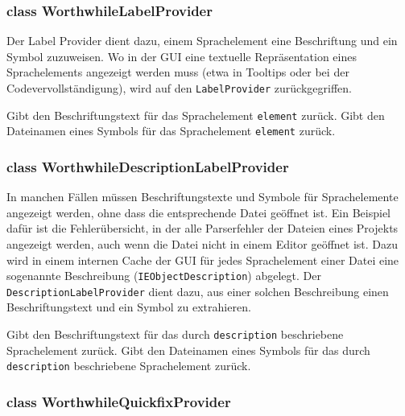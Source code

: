 \subsubsection{class WorthwhileLabelProvider}

Der Label Provider dient dazu, einem Sprachelement eine Beschriftung und ein Symbol zuzuweisen. Wo in der GUI eine textuelle Repräsentation eines Sprachelements angezeigt werden muss (etwa in Tooltips oder bei der Codevervollständigung), wird auf den \texttt{LabelProvider} zurückgegriffen.

\begin{description}
	 Gibt den Beschriftungstext für das Sprachelement \texttt{element} zurück.
	 Gibt den Dateinamen eines Symbols für das Sprachelement \texttt{element} zurück.
\end{description}

\subsubsection{class WorthwhileDescriptionLabelProvider}

In manchen Fällen müssen Beschriftungstexte und Symbole für Sprachelemente angezeigt werden, ohne dass die entsprechende Datei geöffnet ist. Ein Beispiel dafür ist die Fehlerübersicht, in der alle Parserfehler der Dateien eines Projekts angezeigt werden, auch wenn die Datei nicht in einem Editor geöffnet ist. Dazu wird in einem internen Cache der GUI für jedes Sprachelement einer Datei eine sogenannte Beschreibung (\texttt{IEObjectDescription}) abgelegt. Der \texttt{DescriptionLabelProvider} dient dazu, aus einer solchen Beschreibung einen Beschriftungstext und ein Symbol zu extrahieren.

\begin{description}
	 Gibt den Beschriftungstext für das durch \texttt{description} beschriebene Sprachelement zurück.
	 Gibt den Dateinamen eines Symbols für das durch \texttt{description} beschriebene Sprachelement zurück.
\end{description}

\subsubsection{class WorthwhileQuickfixProvider}

